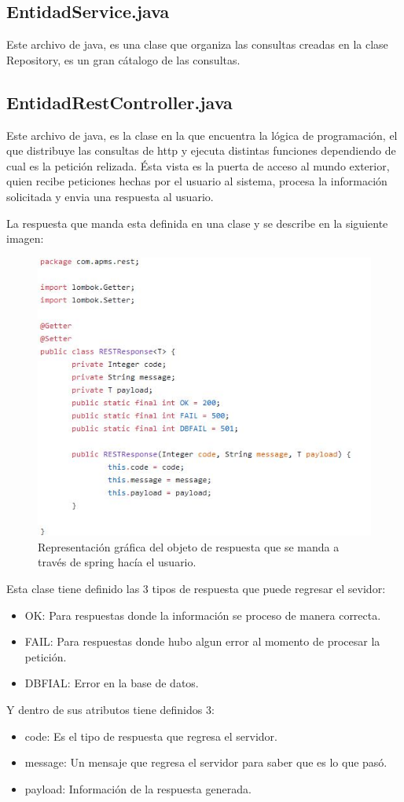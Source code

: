 \subsection{EntidadService.java}
Este archivo de java, es una clase que organiza las consultas creadas en la clase Repository, es un gran cátalogo de las consultas.
\subsection{EntidadRestController.java}
Este archivo de java, es la clase en la que encuentra la lógica de programación, el que distribuye las consultas de http y ejecuta distintas funciones dependiendo de cual es la petición relizada.
Ésta vista es la puerta de acceso al mundo exterior, quien recibe peticiones hechas por el usuario al sistema, procesa la información solicitada y envia una respuesta al usuario.

La respuesta que manda esta definida en una clase y se describe en la siguiente imagen: 
\begin{figure}[!h]
	\centering
	\includegraphics[width=0.6\linewidth]{images/tecnologias/Response.JPG}
	\caption{Representación gráfica del objeto de respuesta que se manda a través de spring hacía el usuario.}
\end{figure}
Esta clase tiene definido las 3 tipos de respuesta que puede regresar el sevidor:
\begin{itemize}
    \item OK: Para respuestas donde la información se proceso de manera correcta.
    \item FAIL: Para respuestas donde hubo algun error al momento de procesar la petición.
    \item DBFIAL: Error en la base de datos.
\end{itemize}
Y dentro de sus atributos tiene definidos 3:
\begin{itemize}
    \item code: Es el tipo de respuesta que regresa el servidor.
    \item message: Un mensaje que regresa el servidor para saber que es lo que pasó.
    \item payload: Información de la respuesta generada.
\end{itemize}

